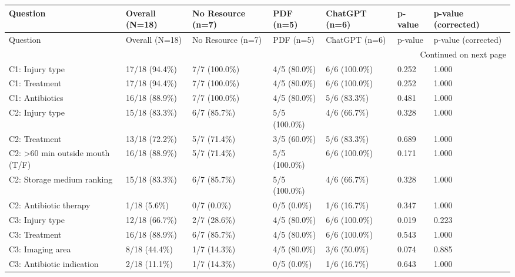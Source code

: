 \begin{longtable}{lllllll}
\toprule
Question & Overall (N=18) & No Resource (n=7) & PDF (n=5) & ChatGPT (n=6) & p-value & p-value (corrected) \\
\midrule
\endfirsthead
\toprule
Question & Overall (N=18) & No Resource (n=7) & PDF (n=5) & ChatGPT (n=6) & p-value & p-value (corrected) \\
\midrule
\endhead
\midrule
\multicolumn{7}{r}{Continued on next page} \\
\midrule
\endfoot
\bottomrule
\endlastfoot
C1: Injury type & 17/18 (94.4\%) & 7/7 (100.0\%) & 4/5 (80.0\%) & 6/6 (100.0\%) & 0.252 & 1.000 \\
C1: Treatment & 17/18 (94.4\%) & 7/7 (100.0\%) & 4/5 (80.0\%) & 6/6 (100.0\%) & 0.252 & 1.000 \\
C1: Antibiotics & 16/18 (88.9\%) & 7/7 (100.0\%) & 4/5 (80.0\%) & 5/6 (83.3\%) & 0.481 & 1.000 \\
C2: Injury type & 15/18 (83.3\%) & 6/7 (85.7\%) & 5/5 (100.0\%) & 4/6 (66.7\%) & 0.328 & 1.000 \\
C2: Treatment & 13/18 (72.2\%) & 5/7 (71.4\%) & 3/5 (60.0\%) & 5/6 (83.3\%) & 0.689 & 1.000 \\
C2: >60 min outside mouth (T/F) & 16/18 (88.9\%) & 5/7 (71.4\%) & 5/5 (100.0\%) & 6/6 (100.0\%) & 0.171 & 1.000 \\
C2: Storage medium ranking & 15/18 (83.3\%) & 6/7 (85.7\%) & 5/5 (100.0\%) & 4/6 (66.7\%) & 0.328 & 1.000 \\
C2: Antibiotic therapy & 1/18 (5.6\%) & 0/7 (0.0\%) & 0/5 (0.0\%) & 1/6 (16.7\%) & 0.347 & 1.000 \\
C3: Injury type & 12/18 (66.7\%) & 2/7 (28.6\%) & 4/5 (80.0\%) & 6/6 (100.0\%) & 0.019 & 0.223 \\
C3: Treatment & 16/18 (88.9\%) & 6/7 (85.7\%) & 4/5 (80.0\%) & 6/6 (100.0\%) & 0.543 & 1.000 \\
C3: Imaging area & 8/18 (44.4\%) & 1/7 (14.3\%) & 4/5 (80.0\%) & 3/6 (50.0\%) & 0.074 & 0.885 \\
C3: Antibiotic indication & 2/18 (11.1\%) & 1/7 (14.3\%) & 0/5 (0.0\%) & 1/6 (16.7\%) & 0.643 & 1.000 \\
\end{longtable}
